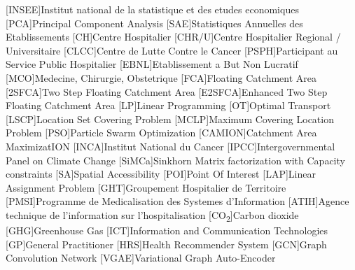 \begin{multicols}{2}

        \begin{acronym}
                [INSEE]{Institut national de la statistique et des etudes economiques}
                [PCA]{Principal Component Analysis}
                [SAE]{Statistiques Annuelles des Etablissements}
                [CH]{Centre Hospitalier}
                [CHR/U]{Centre Hospitalier Regional / Universitaire}
                [CLCC]{Centre de Lutte Contre le Cancer}
                [PSPH]{Participant au Service Public Hospitalier }
                [EBNL]{Etablissement a But Non Lucratif}
                [MCO]{Medecine, Chirurgie, Obstetrique}
                [FCA]{Floating Catchment Area}
                [2SFCA]{Two Step Floating Catchment Area}
                [E2SFCA]{Enhanced Two Step Floating Catchment Area}
                [LP]{Linear Programming}
                [OT]{Optimal Transport}
                [LSCP]{Location Set Covering Problem}
                [MCLP]{Maximum Covering Location Problem}
                [PSO]{Particle Swarm Optimization}
                [CAMION]{Catchment Area MaximizatION}
                [INCA]{Institut National du Cancer}
                [IPCC]{Intergovernmental Panel on Climate Change}
                [SiMCa]{Sinkhorn Matrix factorization with Capacity constraints}
                [SA]{Spatial Accessibility}
                [POI]{Point Of Interest}
                [LAP]{Linear Assignment Problem}
                [GHT]{Groupement Hospitalier de Territoire}
                [PMSI]{Programme de Medicalisation des Systemes d'Information}
                [ATIH]{Agence technique de l'information sur l'hospitalisation}
                [CO\textsubscript{2}]{Carbon dioxide}
                [GHG]{Greenhouse Gas}
                [ICT]{Information and Communication Technologies}
                [GP]{General Practitioner}
                [HRS]{Health Recommender System}
                [GCN]{Graph Convolution Network}
                [VGAE]{Variational Graph Auto-Encoder}
        \end{acronym}

\end{multicols}
